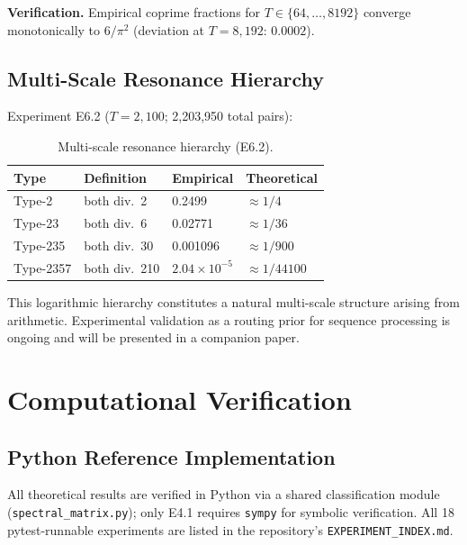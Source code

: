 \documentclass[10pt,twocolumn]{article}
\begin{document}
\noindent\textbf{Verification.} Empirical coprime fractions for
$T \in \{64, \ldots, 8192\}$ converge monotonically to $6/\pi^2$
(deviation at $T=8{,}192$: $0.0002$).

\subsection{Multi-Scale Resonance Hierarchy}

Experiment E6.2 ($T = 2{,}100$; 2{,}203{,}950 total pairs):

\begin{table}[htbp]
\centering
\caption{Multi-scale resonance hierarchy (E6.2).}\label{tab:resonance}
\small
\setlength{\tabcolsep}{4pt}
\begin{tabular}{@{}llll@{}}
\toprule
Type    & Definition      & Empirical         & Theoretical \\
\midrule
Type-2    & both div.\ 2   & 0.2499            & $\approx 1/4$     \\
Type-23   & both div.\ 6   & 0.02771           & $\approx 1/36$    \\
Type-235  & both div.\ 30  & 0.001096          & $\approx 1/900$   \\
Type-2357 & both div.\ 210 & $2.04\!\times\!10^{-5}$ & $\approx 1/44100$ \\
\bottomrule
\end{tabular}
\end{table}

This logarithmic hierarchy constitutes a natural multi-scale structure
arising from arithmetic. Experimental validation as a routing prior for
sequence processing is ongoing and will be presented in a companion paper.

\section{Computational Verification}

\subsection{Python Reference Implementation}

All theoretical results are verified in Python via a shared
classification module (\texttt{spectral\_matrix.py}); only E4.1 requires
\texttt{sympy} for symbolic verification. All 18 pytest-runnable
experiments are listed in the repository's \texttt{EXPERIMENT\_INDEX.md}.
\end{document}
